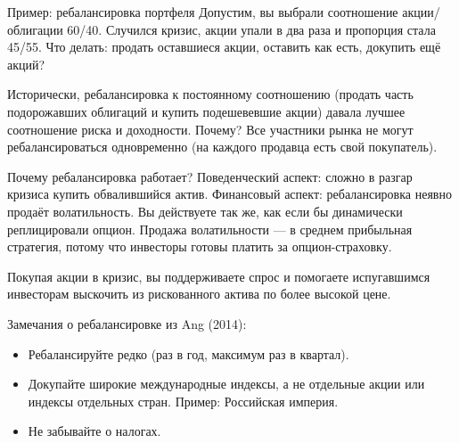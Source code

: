 \documentclass{beamer}
\begin{document}
\begin{frame}{Пример: ребалансировка портфеля}
\justify
Допустим, вы выбрали соотношение акции/облигации 60/40. Случился кризис, акции упали в два раза и пропорция стала 45/55. Что делать: продать оставшиеся акции, оставить как есть, докупить ещё акций?

\justify
Исторически, ребалансировка к постоянному соотношению (продать часть подорожавших облигаций и купить подешевевшие акции) давала лучшее соотношение риска и доходности. Почему? Все участники рынка не могут ребалансироваться одновременно (на каждого продавца есть свой покупатель).

\end{frame}



\begin{frame}{Почему ребалансировка работает?}
\justify
Поведенческий аспект: сложно в разгар кризиса купить обвалившийся актив. Финансовый аспект: ребалансировка неявно продаёт волатильность. Вы действуете так же, как если бы динамически реплицировали опцион. Продажа волатильности --- в среднем прибыльная стратегия, потому что инвесторы готовы платить за опцион-страховку.

\justify
Покупая акции в кризис, вы поддерживаете спрос и помогаете испугавшимся инвесторам выскочить из рискованного актива по более высокой цене.

\justify
Замечания о ребалансировке из Ang (2014):
\begin{itemize}
\justifying
\item Ребалансируйте редко (раз в год, максимум раз в квартал).
\item Докупайте широкие международные индексы, а не отдельные акции или индексы отдельных стран. Пример: Российская империя.
\item Не забывайте о налогах.
\end{itemize}
\end{frame}
\end{document}
